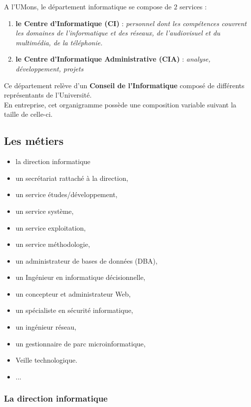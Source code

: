 \documentclass[10pt,a4paper,oneside,titlepage]{report}
\newcommand{\firebrick}[1]{\textcolor{firebrick4}{#1}}
\newcommand{\titre}[1]{\textcolor{title}{#1}}
\newcommand{\newterm}[1]{\textit{#1}}
\newcommand{\strong}[1]{\textbf{\titre{#1}}}
\begin{document}
\begin{sffamily}
\noindent A l'UMons, le département informatique se compose de $2$ services :
\begin{enumerate}
\item \textbf{\strong{le Centre d'Informatique} (\firebrick{CI})} : \newterm{personnel dont les compétences couvrent les domaines de l'informatique et des réseaux, de 
l'audiovisuel et du multimédia, de la téléphonie.}
\item \textbf{\strong{le Centre d'Informatique Administrative} (\firebrick{CIA})} : \newterm{analyse, développement, projets}
\end{enumerate}
Ce département relève d'un \strong{Conseil de l'Informatique} composé de différents représentants de l'Université.\\
En entreprise, cet organigramme possède une composition variable suivant la taille de celle-ci.

\subsection{Les métiers}

\begin{itemize}
\item la direction informatique
\item un secrétariat rattaché à la direction,
\item un service études/développement,
\item un service système,
\item un service exploitation,
\item un service méthodologie,
\item un administrateur de bases de données (DBA),
\item un Ingénieur en informatique décisionnelle,
\item un concepteur et administrateur Web,
\item un spécialiste en sécurité informatique,
\item un ingénieur réseau,
\item un gestionnaire de parc microinformatique,
\item Veille technologique.
\item ...
\end{itemize}

\subsubsection{La direction informatique}


\end{sffamily}
\end{document}
